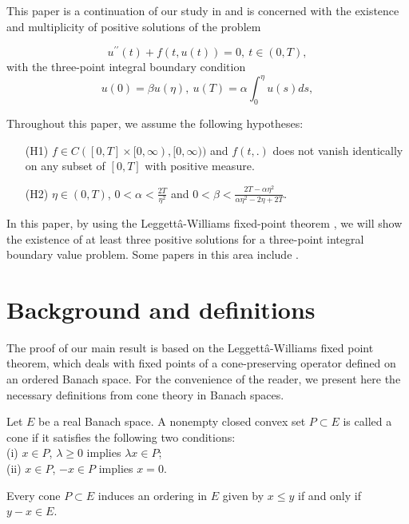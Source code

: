 \documentclass[reqno]{amsart}\usepackage{amsmath}
\begin{document}
This paper is a continuation of our study in \cite{Had1,Had2} and is concerned with the existence and multiplicity of positive solutions of the problem


\begin{equation} \label{eq-4}
{u^{\prime \prime }}(t)+f(t, u(t))=0,\ t\in(0,T),
\end{equation}
with the three-point integral boundary condition
\begin{equation} \label{eq-5}
u(0)={\beta}u(\eta),\ u(T)={\alpha}\int_{0}^{\eta}u(s)ds,
\end{equation}





Throughout this paper, we assume the following hypotheses:

\begin{itemize}
\item[(H1)]
 $f\in C([0, T]\times[0,\infty),[0,\infty))$ and $f(t, .)$ does not
vanish identically on any subset of $[0, T]$ with positive measure.

\item[(H2)] $\eta\in(0, T)$, $0<{\alpha}< \frac{2T}{{\eta}^{2}}$ and
$0<{\beta}<\frac{2T-\alpha\eta^{2}}{\alpha\eta^{2}-2\eta+2T}$.
\end{itemize}


In this paper, by using the Leggettâ-Williams fixed-point theorem \cite{Leg}, we will show the existence of at least three positive solutions for a three-point integral boundary value
problem. Some papers in this area include  \cite{Luo, Ping, Xian, Ander1, Ander2, Avery, He, Agar}.


\section{Background and definitions}

The proof of our main result is based on the Leggettâ-Williams fixed point
theorem, which deals with fixed points of a cone-preserving operator
defined on an ordered Banach space. For the convenience of the reader, we
present here the necessary definitions from cone theory in Banach spaces.


\begin{definition}
Let $E$ be a real Banach space. A nonempty closed convex set
$P\subset E $ is called a cone if it satisfies the following two conditions:\\
(i) $x\in P$, $\lambda\geq0$ implies $\lambda x\in P$;\\
(ii) $x\in P$, $-x\in P$ implies $x=0$.

Every cone $P\subset E$ induces an ordering in $E$ given by
$x\leq y $ if and only if $y-x \in E$.
\end{definition}
\end{document}
